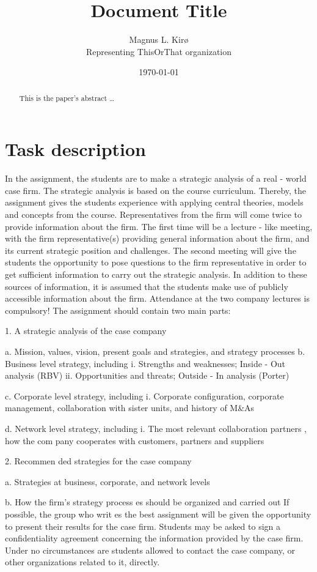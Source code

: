 \documentclass[12pt, a4paper]{article}
\title{
	Document Title
}
\author{
	Magnus L. Kirø \\
	Representing ThisOrThat organization %
}
\date{\today}
\begin{document}
\maketitle
{}

\begin{abstract}
This is the paper's abstract \ldots
\end{abstract}

\section{Task description}
In the assignment, the students are to make a strategic analysis of a real -
world case firm. The strategic analysis is based on the course curriculum.
Thereby, the assignment gives the students experience with applying central
theories, models and concepts from the course. Representatives from the firm
will come twice to provide information about the firm. The first time will be a
lecture - like meeting, with the firm representative(s) providing general
information about the firm, and its current strategic position and challenges.
The second meeting will give the students the opportunity to pose questions to
the firm representative in order to get sufficient information to carry out the
strategic analysis. In addition to these sources of information, it is assumed
that the students make use of publicly accessible information about the firm.
Attendance at the two company lectures is compulsory! The assignment should
contain two main parts:

1.
A strategic analysis of the case company

a.
Mission, values, vision, present goals
and strategies, and strategy processes
b.
Business level strategy, including
i.
Strengths and weaknesses; Inside
-
Out analysis (RBV)
ii.
Opportunities and threats; Outside - In analysis (Porter)

c.
Corporate level strategy, including
i.
Corporate configuration, corporate management, collaboration with sister units,
and history of M&As

d.
Network level strategy, including
i.
The most relevant collaboration partners
, how the com pany cooperates with customers, partners and suppliers

2.
Recommen
ded strategies for the case company

a.
Strategies at business, corporate, and network levels

b.
How the firm’s strategy process
es
should be organized and carried out
If possible, the group who writ es the best assignment will be given the
opportunity to present their results for the case firm. Students may be asked to
sign a confidentiality agreement concerning the information provided by the case
firm. Under no circumstances are students allowed to contact the case company,
or other organizations related to it, directly.
\end{document}
